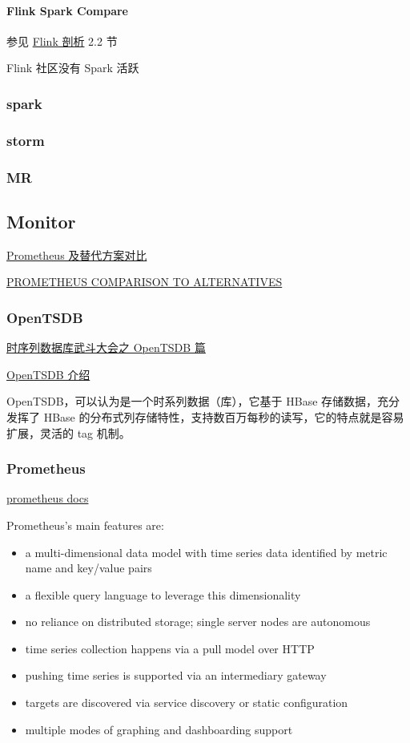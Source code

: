 \documentclass[hyperref, UTF-8]{ctexart}
\begin{document}
\paragraph{Flink Spark Compare}
\label{sec:orgdc57ac9}

参见 \href{http://www.cnblogs.com/smartloli/p/5580757.html}{Flink 剖析} 2.2 节

Flink 社区没有 Spark 活跃

\subsubsection{spark}
\label{sec:org81ca55d}
\subsubsection{storm}
\label{sec:org8273a74}
\subsubsection{MR}
\label{sec:orgdc19c7f}
\subsection{Monitor}
\label{sec:org9be97eb}
\href{https://addops.cn/post/comparison-to-alternatives.html}{Prometheus 及替代方案对比}

\href{https://prometheus.io/docs/introduction/comparison/}{PROMETHEUS COMPARISON TO ALTERNATIVES}
\subsubsection{OpenTSDB}
\label{sec:orga3ff714}
\href{http://liubin.org/blog/2016/03/05/tsdb-opentsdb/}{时序列数据库武斗大会之 OpenTSDB 篇}

\href{http://www.cnblogs.com/shuiyelifang/p/7909594.html}{OpenTSDB 介绍}

OpenTSDB，可以认为是一个时系列数据（库），它基于 HBase 存储数据，充分发挥了 HBase 的分布式列存储特性，支持数百万每秒的读写，它的特点就是容易扩展，灵活的 tag 机制。
\subsubsection{Prometheus}
\label{sec:org97a50ea}
\href{https://prometheus.io/docs/introduction/overview/}{prometheus docs}

Prometheus's main features are:
\begin{itemize}
\item a multi-dimensional data model with time series data identified by metric name and key/value pairs
\item a flexible query language to leverage this dimensionality
\item no reliance on distributed storage; single server nodes are autonomous
\item time series collection happens via a pull model over HTTP
\item pushing time series is supported via an intermediary gateway
\item targets are discovered via service discovery or static configuration
\item multiple modes of graphing and dashboarding support
\end{itemize}
\end{document}
